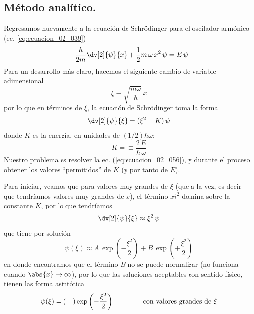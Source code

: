 \subsection{Método analítico.}
Regresamos nuevamente a la ecuación de Schrödinger para el oscilador armónico (ec. \ref{eq:ecuacion_02_039})
\begin{align*}
- \dfrac{\hbar}{2 m} \dv[2]{\psi}{x} + \dfrac{1}{2} m \, \omega \, x^{2} \, \psi = E \, \psi  
\end{align*}
Para un desarrollo más claro, hacemos el siguiente cambio de variable adimensional
\begin{equation}
\xi \equiv \sqrt{ \dfrac{m \omega}{\hbar}} \, x
\label{eq:ecuacion_02_055}
\end{equation}
por lo que en términos de $\xi$, la ecuación de Schrödinger toma la forma
\begin{equation}
\dv[2]{\psi}{\xi} = (\xi^{2} - K) \, \psi
\label{eq:ecuacion_02_056}
\end{equation}
donde $K$ es la energía, en unidades de $(1/2) \hbar \omega$:
\begin{equation}
K = \equiv \dfrac{2 \, E}{\hbar \, \omega}
\label{eq:ecuacion_02_057}
\end{equation}
Nuestro problema es resolver la ec. (\ref{eq:ecuacion_02_056}), y durante el proceso obtener los valores \enquote{permitidos} de $K$ (y por tanto de $E$).
\par
Para iniciar, veamos que para valores muy grandes de $\xi$ (que a la vez, es decir que tendríamos valores muy grandes de $x$), el término $xi^{2}$ domina sobre la constante $K$, por lo que tendríamos
\begin{equation}
\dv[2]{\psi}{\xi} \approx \xi^{2} \, \psi
\label{eq:ecuacion_02_058}
\end{equation}
que tiene por solución
\begin{equation}
\psi (\xi) \approx A \, \exp \left( - \dfrac{\xi^{2}}{2} \right) + B \, \exp \left( + \dfrac{\xi^{2}}{2} \right)
\label{eq:ecuacion_02_059}
\end{equation}
en donde encontramos que el término $B$ no se puede normalizar (no funciona cuando $\abs{x} \to \infty$), por lo que las soluciones aceptables con sentido físico, tienen las forma asintótica
\begin{equation}
\psi (\xi) = ( \quad ) \exp \left( - \dfrac{\xi^{2}}{2} \right) \hspace{1.5cm} \text{con valores grandes de } \xi
\label{eq:ecuacion_02_060}
\end{equation}
